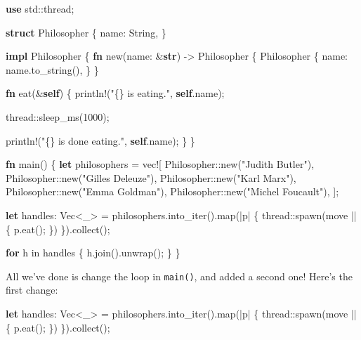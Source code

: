 \documentclass[a4paper,]{book}
\newenvironment{Shaded}{\begin{snugshade}}{\end{snugshade}}
\newcommand{\KeywordTok}[1]{\textcolor[rgb]{0.13,0.29,0.53}{\textbf{{#1}}}}
\newcommand{\DecValTok}[1]{\textcolor[rgb]{0.00,0.00,0.81}{{#1}}}
\newcommand{\StringTok}[1]{\textcolor[rgb]{0.31,0.60,0.02}{{#1}}}
\newcommand{\OtherTok}[1]{\textcolor[rgb]{0.56,0.35,0.01}{{#1}}}
\newcommand{\NormalTok}[1]{{#1}}
\begin{document}
\begin{Shaded}
\begin{Highlighting}[]
\KeywordTok{use} \NormalTok{std::thread;}

\KeywordTok{struct} \NormalTok{Philosopher \{}
    \NormalTok{name: String,}
\NormalTok{\}   }

\KeywordTok{impl} \NormalTok{Philosopher \{ }
    \KeywordTok{fn} \NormalTok{new(name: &}\KeywordTok{str}\NormalTok{) -> Philosopher \{}
        \NormalTok{Philosopher \{}
            \NormalTok{name: name.to_string(),}
        \NormalTok{\}}
    \NormalTok{\}}

    \KeywordTok{fn} \NormalTok{eat(&}\KeywordTok{self}\NormalTok{) \{}
        \OtherTok{println!}\NormalTok{(}\StringTok{"\{\} is eating."}\NormalTok{, }\KeywordTok{self}\NormalTok{.name);}

        \NormalTok{thread::sleep_ms(}\DecValTok{1000}\NormalTok{);}

        \OtherTok{println!}\NormalTok{(}\StringTok{"\{\} is done eating."}\NormalTok{, }\KeywordTok{self}\NormalTok{.name);}
    \NormalTok{\}}
\NormalTok{\}}

\KeywordTok{fn} \NormalTok{main() \{}
    \KeywordTok{let} \NormalTok{philosophers = }\OtherTok{vec!}\NormalTok{[}
        \NormalTok{Philosopher::new(}\StringTok{"Judith Butler"}\NormalTok{),}
        \NormalTok{Philosopher::new(}\StringTok{"Gilles Deleuze"}\NormalTok{),}
        \NormalTok{Philosopher::new(}\StringTok{"Karl Marx"}\NormalTok{),}
        \NormalTok{Philosopher::new(}\StringTok{"Emma Goldman"}\NormalTok{),}
        \NormalTok{Philosopher::new(}\StringTok{"Michel Foucault"}\NormalTok{),}
    \NormalTok{];}

    \KeywordTok{let} \NormalTok{handles: Vec<_> = philosophers.into_iter().map(|p| \{}
        \NormalTok{thread::spawn(move || \{}
            \NormalTok{p.eat();}
        \NormalTok{\})}
    \NormalTok{\}).collect();}

    \KeywordTok{for} \NormalTok{h in handles \{}
        \NormalTok{h.join().unwrap();}
    \NormalTok{\}}
\NormalTok{\}}
\end{Highlighting}
\end{Shaded}

All we've done is change the loop in \texttt{main()}, and added a second
one! Here's the first change:

\begin{Shaded}
\begin{Highlighting}[]
\KeywordTok{let} \NormalTok{handles: Vec<_> = philosophers.into_iter().map(|p| \{}
    \NormalTok{thread::spawn(move || \{}
        \NormalTok{p.eat();}
    \NormalTok{\})}
\NormalTok{\}).collect();}
\end{Highlighting}
\end{Shaded}
\end{document}
